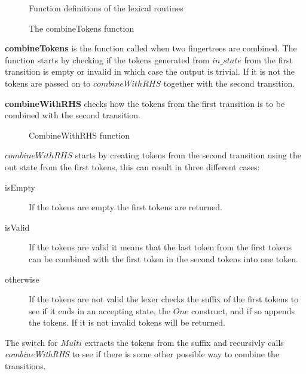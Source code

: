 \begin{figure}[h!]
  
  \caption{Function definitions of the lexical routines \label{fig:funheads}}
\end{figure}

\begin{figure}[h!]
  
  \caption{The combineTokens function \label{fig:combinetoks}}
\end{figure}

\textbf{combineTokens} is the function called when two fingertrees are combined.
The function starts by checking if the tokens generated from $in\_state$ from
the first transition is empty or invalid in which case the output is trivial. If
it is not the tokens are passed on to $combineWithRHS$ together with the second
transition.

\textbf{combineWithRHS} checks how the tokens from the first
transition is to be combined with the second transition.

\begin{figure}[h!]
  
  \caption{CombineWithRHS function\label{fig:cwrhs}}
\end{figure}

$combineWithRHS$ starts by creating tokens from the second transition using the
out state from the first tokens, this can result in three different cases:
\begin{description}
\item[isEmpty]If the tokens are empty the first tokens are returned.
\item[isValid]If the tokens are valid it means that the last token from the
first tokens can be combined with the first token in the second tokens into one
token.
\item[otherwise]If the tokens are not valid the lexer checks the suffix of the
first tokens to see if it ends in an accepting state, the $One$ construct, and
if so appends the tokens. If it is not invalid tokens will be returned.
\end{description}
The switch for $Multi$ extracts the tokens from the suffix and recursivly calls
\emph{combineWithRHS} to see if there is some other possible way to combine the
transitions.

